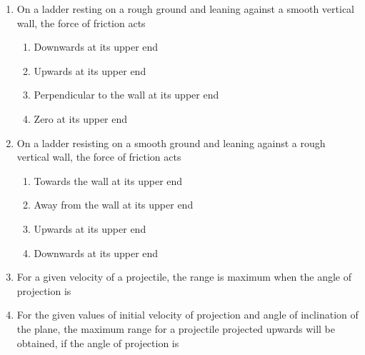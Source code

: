 \documentclass[11pt,a4paper]{article}
\begin{document}
\begin{enumerate}
\item{On a ladder resting on a rough ground and leaning against a smooth vertical wall, the force of friction acts}
\begin{enumerate}[label=\Alph*.]
\item{Downwards at its upper end}
\item{Upwards at its upper end}
\item{Perpendicular to the wall at its upper end}
\item{Zero at its upper end}
\end{enumerate}
\item{On a ladder resisting on a smooth ground and leaning against a rough vertical wall, the force of friction acts}
\begin{enumerate}[label=\Alph*.]
\item{Towards the wall at its upper end}
\item{Away from the wall at its upper end}
\item{Upwards at its upper end}
\item{Downwards at its upper end}
\end{enumerate}
\item{For a given velocity of a projectile, the range is maximum when the angle of projection is}
\\
\item{For the given values of initial velocity of projection and angle of inclination of the plane, the maximum range for a projectile projected upwards will be obtained, if the angle of projection is}
\\

\end{enumerate}
\end{document}
